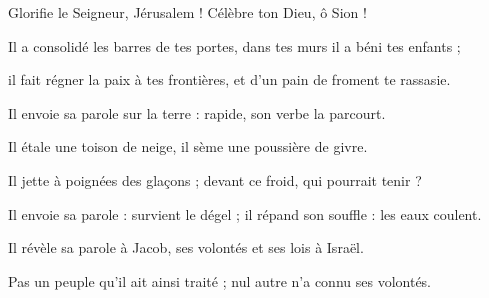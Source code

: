 \item Glorifie le Seigneur, Jérusalem ! Célèbre ton Dieu, ô Sion !

\item Il a consolidé les barres de tes portes, dans tes murs il a béni tes enfants ;

\item il fait régner la paix à tes frontières, et d'un pain de froment te rassasie.

\item Il envoie sa parole sur la terre : rapide, son verbe la parcourt.

\item Il étale une toison de neige, il sème une poussière de givre.

\item Il jette à poignées des glaçons ; devant ce froid, qui pourrait tenir ?

\item Il envoie sa parole : survient le dégel ; il répand son souffle : les eaux coulent.

\item Il révèle sa parole à Jacob, ses volontés et ses lois à Israël.

\item Pas un peuple qu'il ait ainsi traité ; nul autre n'a connu ses volontés.